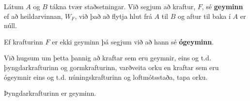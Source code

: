 \begin{tcolorbox}
\begin{definition}
Látum $A$ og $B$ tákna tvær staðsetningar. Við segjum að kraftur, $F$, sé \textbf{geyminn} ef að heildarvinnan, $W_F$, við það að flytja hlut frá $A$ til $B$ og aftur til baka í $A$ er núll.
\end{definition}
\end{tcolorbox}

\begin{tcolorbox}
\begin{definition}
Ef krafturinn $F$ er ekki geyminn þá segjum við að hann sé \textbf{ógeyminn}.
\end{definition}
\end{tcolorbox}

Við hugsum um þetta þannig að kraftar sem eru geymnir, eins og t.d. þyngdarkrafturinn og gormkrafturinn, varðveita orku en kraftar sem eru ógeymnir eins og t.d. núningskrafturinn og loftmótsstaða, tapa orku.

\begin{tcolorbox}
\begin{theorem}
Þyngdarkrafturinn er geyminn.
\end{theorem}
\end{tcolorbox}

